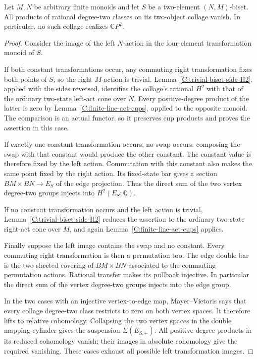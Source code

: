 \begin{theorem}
\label{C:two-cross-arrows-universal}
Let $M,N$ be arbitrary finite monoids and let $S$ be a
two-element $(N,M)$-biset.  All products of rational degree-two
classes on its two-object collage vanish.  In particular, no
such collage realizes $\mathbb CP^2$.
\end{theorem}
\begin{proof}
Consider the image of the left $N$-action in the four-element
transformation monoid of $S$.

If both constant transformations occur, any commuting right
transformation fixes both points of $S$, so the right $M$-action
is trivial.  Lemma~\ref{C:trivial-biset-side-H2}, applied with
the sides reversed, identifies the collage's rational $H^2$
with that of the ordinary two-state left-act cone over $N$.
Every positive-degree product of the latter is zero by
Lemma~\ref{C:finite-line-act-cups}, applied to the opposite
monoid.  The comparison is an actual functor, so it preserves
cup products and proves the assertion in this case.

If exactly one constant transformation occurs, no swap occurs:
composing the swap with that constant would produce the other
constant.  The constant value is therefore fixed by the left
action.  Commutation with this constant also makes the same
point fixed by the right action.  Its fixed-state bar gives a
section $BM\times BN\to E_S$ of the edge projection.
Thus the direct sum of the two vertex degree-two groups
injects into $H^2(E_S;\mathbb Q)$.

If no constant transformation occurs and the left action is
trivial, Lemma~\ref{C:trivial-biset-side-H2} reduces the assertion
to the ordinary two-state right-act cone over $M$, and again
Lemma~\ref{C:finite-line-act-cups} applies.

Finally suppose the left image contains the swap and no constant.
Every commuting right transformation is then a permutation too.
The edge double bar is the two-sheeted covering of $BM\times BN$
associated to the commuting permutation actions.  Rational
transfer makes its pullback injective.  In particular the direct
sum of the vertex degree-two groups injects into the edge group.

In the two cases with an injective vertex-to-edge map,
Mayer--Vietoris says that every collage degree-two class restricts
to zero on both vertex spaces.  It therefore lifts to relative
cohomology.  Collapsing the two vertex spaces in the double
mapping cylinder gives the suspension $\Sigma(E_{S,+})$.
All positive-degree products in its reduced cohomology vanish;
their images in absolute cohomology give the required vanishing.
These cases exhaust all possible left transformation images.
\end{proof}

